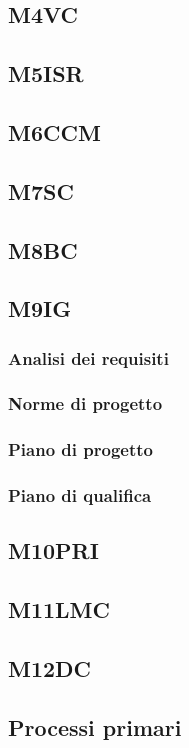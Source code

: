 {{{{{{{{{{{{\subsection{M4VC}
\subsection{M5ISR}
\subsection{M6CCM}
\subsection{M7SC}
\subsection{M8BC}
\subsection{M9IG}
\subsubsection{Analisi dei requisiti}
\subsubsection{Norme di progetto}
\subsubsection{Piano di progetto}

\subsubsection{Piano di qualifica}
\subsection{M10PRI}
\subsection{M11LMC}
\subsection{M12DC}






\subsection{Processi primari}
    
}}}}}}}}}}}}
